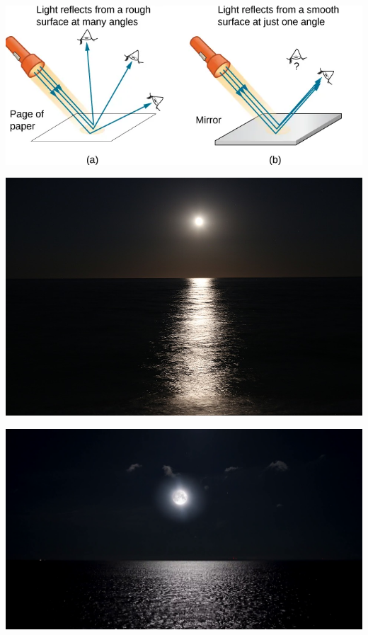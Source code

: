 \documentclass{beamer}
\begin{document}
\begin{frame}
	\begin{center}
		\includegraphics[scale=0.5]{8.png}
	\end{center}
\end{frame}
\begin{frame}
	\begin{center}
		\includegraphics[scale=0.32]{9.jpeg}
	\end{center}
\end{frame}
\begin{frame}

	\begin{center}
		\includegraphics[scale=0.18]{10.png}
	\end{center}
\end{frame}
\end{document}
